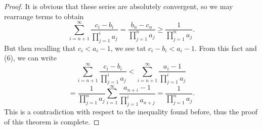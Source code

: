 \documentclass[12pt]{article}
\begin{document}
\begin{proof}
It is obvious that these series are absolutely convergent, so we may rearrange terms to obtain
\begin{equation*}
\sum_{i=n+1}^\infty \frac{c_i-b_i}{\prod_{j=1}^i a_j} = \frac{b_n-c_n}{\prod_{j=1}^n a_j}\geq\frac{1}{\prod_{j=1}^n a_j}.
\end{equation*}
But then recalling that $c_i < a_i - 1$, we see tat $c_i - b_i < a_i - 1$. From this fact and (6), we can write
\begin{equation*}
\sum_{i=n+1}^\infty \frac{c_i-b_i}{\prod_{j=1}^i a_j}<\sum_{i=n+1}^\infty \frac{a_i-1}{\prod_{j=1}^i a_j}
\end{equation*}
\begin{equation*}
= \frac{1}{\prod_{j=1}^n a_j}\sum_{i=1}^\infty \frac{a_{n+i}-1}{\prod_{j=1}^i a_{n+j}} = \frac{1}{\prod_{j=1}^n a_j}.
\end{equation*}
This is a contradiction with respect to the inequality found before, thus the proof of this theorem is complete.
\end{proof}
\end{document}
